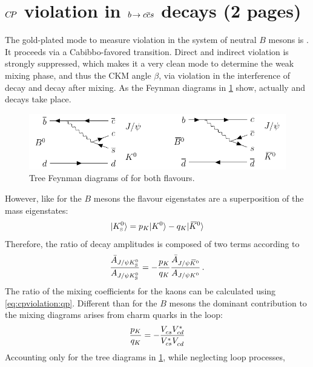 
\section{\texorpdfstring{${C\!P}$}{CP} violation in \texorpdfstring{${b}\!\rightarrow {\ensuremath{c}}{\ensuremath{\overline {{c}}}}{\ensuremath{s}}$}{bToccbars} decays (2 pages)}
\label{sec:cpviolation:btoccbars}

The gold-plated mode to measure \CP violation in the system of neutral $B$
mesons is \BdToJPsiKS. It proceeds via a Cabibbo-favored \bToccbars
transition. Direct and indirect \CP violation is strongly suppressed, which
makes it a very clean mode to determine the weak mixing phase, and thus the
CKM angle $\beta$, via \CP violation in the interference of decay and decay
after mixing. As the Feynman diagrams in
\cref{fig:cpviolation:bd2jpsiks_feynmans} show, actually
\BdToJPsiKz and \BdbToJPsiKzb decays take place.
\begin{figure}[htb]
\centering
\includegraphics[width=\textwidth]{03-CPViolation/tikz/pdf/BdToJPsiKS_Feynmans.pdf}
\caption{Tree Feynman diagrams of \BdToJPsiKS for both flavours.}
\label{fig:cpviolation:bd2jpsiks_feynmans}
\end{figure}
However, like for the $B$ mesons the flavour eigenstates are a superposition
of the \CP mass eigenstates:
\begin{align}
	|{{K}^0_{\mathrm{ \scriptscriptstyle S}}}\rangle = p_K |{{K}^0}\rangle - q_K |{{\kern 0.2em\overline{\kern -0.2em K}{}}{}^0}\rangle
\end{align}
Therefore, the ratio of decay amplitudes is composed of two terms according to
\begin{align}
	\frac{\bar{A}_{J/\psi{\ensuremath{{K}^0_{\mathrm{ \scriptscriptstyle S}}}}}}{A_{J/\psi{\ensuremath{{K}^0_{\mathrm{ \scriptscriptstyle S}}}}}} = -\frac{p_K}{q_K}\frac{\bar{A}_{J/\psi{\ensuremath{{\kern 0.2em\overline{\kern -0.2em K}{}}{}^0}}}}{A_{J/\psi{\ensuremath{{K}^0}}}}\,.
\end{align}
The ratio of the mixing coefficients for the kaons can be calculated using
\cref{eq:cpviolation:qp}. Different than for the $B$ mesons the dominant
contribution to the mixing diagrams arises from charm quarks in the loop:
\begin{align}
	\frac{p_K}{q_K} = -\frac{{V_{{c}{s}}^{}}{V_{{c}{d}}^\ast}}{{V_{{c}{s}}^\ast}{V_{{c}{d}}^{}}}
\end{align}
Accounting only for the tree diagrams in
\cref{fig:cpviolation:bd2jpsiks_feynmans}, while neglecting loop processes,
